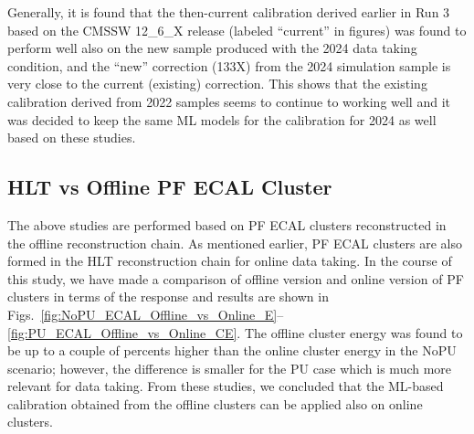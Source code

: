 










Generally, it is found that the then-current calibration derived earlier in Run 3 based on the CMSSW 12\_6\_X release (labeled ``current'' in figures) was found to perform well also on the new sample produced with the 2024 data taking condition,
and the ``new'' correction (133X) from the 2024 simulation sample is very close to the current (existing) correction.
This shows that the existing calibration derived from 2022 samples seems to continue to working well and it was decided to keep the same ML models for the calibration for 2024 as well based on these studies.

\clearpage
\subsection{HLT vs Offline PF ECAL Cluster}

The above studies are performed based on PF ECAL clusters reconstructed in the offline reconstruction chain.
As mentioned earlier, PF ECAL clusters are also formed in the HLT reconstruction chain for online data taking.
In the course of this study, we have made a comparison of offline version and online version of PF clusters in terms of the response and results are shown in Figs.~\ref{fig:NoPU_ECAL_Offline_vs_Online_E}--\ref{fig:PU_ECAL_Offline_vs_Online_CE}.
The offline cluster energy was found to be up to a couple of percents higher than the online cluster energy in the NoPU scenario; however, the difference is smaller for the PU case which is much more relevant for data taking.
From these studies, we concluded that the ML-based calibration obtained from the offline clusters can be applied also on online clusters.



